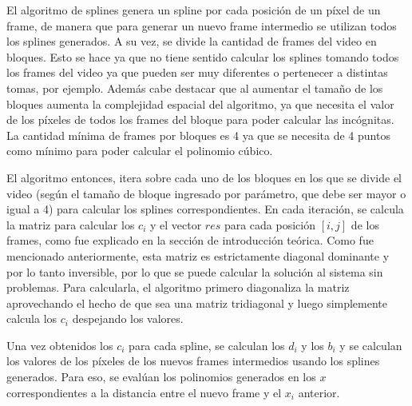 \par El algoritmo de splines genera un spline por cada posición de un píxel de un frame, de manera que para generar un nuevo frame intermedio se utilizan todos los splines generados. A su vez, se divide la cantidad de frames del video en bloques. Esto se hace ya que no tiene sentido calcular los splines tomando todos los frames del video ya que pueden ser muy diferentes o pertenecer a distintas tomas, por ejemplo. Además cabe destacar que al aumentar el tamaño de los bloques aumenta la complejidad espacial del algoritmo, ya que necesita el valor de los píxeles de todos los frames del bloque para poder calcular las incógnitas.  La cantidad mínima de frames por bloques es 4 ya que se necesita de 4 puntos como mínimo para poder calcular el polinomio cúbico.
\par El algoritmo entonces, itera sobre cada uno de los bloques en los que se divide el video (según el tamaño de bloque ingresado por parámetro, que debe ser mayor o igual a 4) para calcular los splines correspondientes. En cada iteración, se calcula la matriz para calcular los $c_i$ y el vector $res$ para cada posición $[i,j]$ de los frames, como fue explicado en la sección de introducción teórica. Como fue mencionado anteriormente, esta matriz es estrictamente diagonal dominante y por lo tanto inversible, por lo que se puede calcular la solución al sistema sin problemas. Para calcularla, el algoritmo primero diagonaliza la matriz aprovechando el hecho de que sea una matriz tridiagonal y luego simplemente calcula los $c_i$ despejando los valores.
\par Una vez obtenidos los $c_i$ para cada spline, se calculan los $d_i$ y los $b_i$ y se calculan los valores de los píxeles de los nuevos frames intermedios usando los splines generados. Para eso, se evalúan los polinomios generados en los $x$ correspondientes a la distancia entre el nuevo frame y el $x_i$ anterior. 

